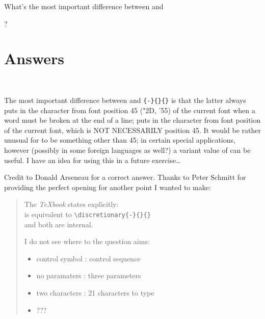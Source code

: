 What's the most important difference between \cs{-} and
\begin{lcode}
\discretionary{-}{}{} ?
\end{lcode}



\section{Answers}


\\

\begin{comment}

[Posted to info-tex on 25 Oct 91; see answer.001]
"*** Exercise 3 (fast):
"What's the most important difference between \- and
"\discretionary{-}{}{}?
\end{comment}

The most important difference between \cs{-} and \cmd{\discretionary}\verb?{-}{}{}?
is that the latter always puts in the character from font position 45
("2D, '55) of the current font when a word must be broken at the end of
a line; \cs{-} puts in the character from font position \cmd{\hyphenchar} of the
current font, which is NOT NECESSARILY position 45. It would be rather
unusual for \cmd{\hyphenchar} to be something other than 45; in certain
special applications, however (possibly in some foreign languages as
well?) a variant value of \cmd{\hyphenchar} can be useful. I have an idea for
using this in a future exercise\ldots

Credit to Donald Arseneau for a correct answer. 
Thanks to Peter Schmitt 
for providing the perfect opening for another point I wanted to make:
\begin{quotation}
 The \emph{TeXbook} states explicitly: \\
       \cs{-} is equivalent to \verb?\discretionary{-}{}{}? \\
 and both are internal. 

  I do not see where to the question aims:
\begin{itemize}
\item control symbol : control sequence
\item no paramaters  : three parameters
\item two characters : 21 characters to type
\item ???
\end{itemize}
\end{quotation}

